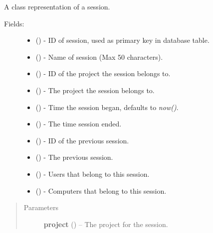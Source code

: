 \documentclass[letterpaper,10pt,english]{sphinxmanual}
\begin{document}

\begin{fulllineitems}
\label{api:models.Session}
A class representation of a session.
\begin{description}
\item[{Fields:}] \leavevmode\begin{itemize}
\item {} 
 () - ID of session, used as primary key in database table.

\item {} 
 () - Name of session (Max 50 characters).

\item {} 
 () - ID of the project the session belongs to.

\item {} 
 () - The project the session belongs to.

\item {} 
 () - Time the session began, defaults to \emph{now()}.

\item {} 
 () - The time session ended.

\item {} 
 () - ID of the previous session.

\item {} 
 () - The previous session.

\item {} 
 () - Users that belong to this session.

\item {} 
 () - Computers that belong to this session.

\end{itemize}

\end{description}
\begin{quote}\begin{description}
\item[{Parameters}] \leavevmode
\textbf{project} ({\hyperref[api:models.Project]{}}) -- The project for the session.


\end{description}
\end{quote}
\end{fulllineitems}
\end{document}

